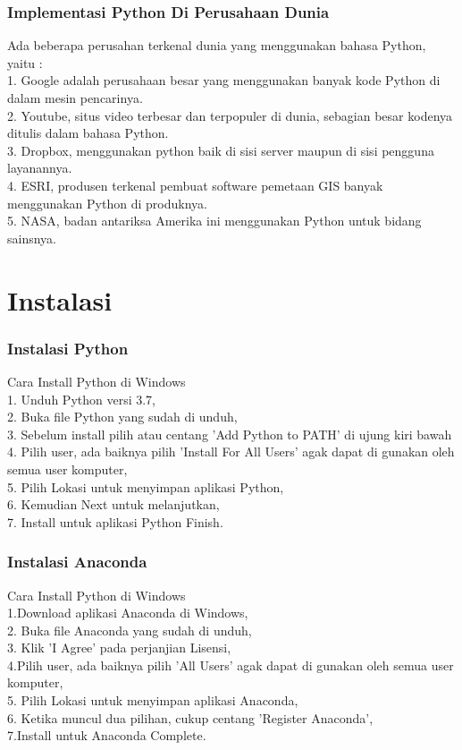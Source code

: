\documentclass[11pt]{Article}
\begin{document}
\subsubsection{Implementasi Python Di Perusahaan Dunia}

Ada beberapa perusahan terkenal dunia yang menggunakan bahasa Python, yaitu :\\
1. Google adalah perusahaan besar yang menggunakan banyak kode Python di dalam mesin pencarinya.\\
2. Youtube, situs video terbesar dan terpopuler di dunia, sebagian besar kodenya ditulis dalam bahasa Python.\\
3. Dropbox, menggunakan python baik di sisi server maupun di sisi pengguna layanannya.\\
4. ESRI, produsen terkenal pembuat software pemetaan GIS banyak menggunakan Python di produknya.\\
5. NASA, badan antariksa Amerika ini menggunakan Python untuk bidang sainsnya.
\section{Instalasi}
\subsubsection{Instalasi Python}

Cara Install Python di Windows\\
1. Unduh Python versi 3.7,\\
2. Buka file Python yang sudah di unduh,\\
3. Sebelum install pilih atau centang 'Add Python to PATH' di ujung kiri bawah
4. Pilih user, ada baiknya pilih 'Install For All Users' agak dapat di gunakan oleh semua user komputer,\\
5. Pilih Lokasi untuk menyimpan aplikasi Python,\\
6. Kemudian Next untuk melanjutkan,\\
7. Install untuk aplikasi Python Finish.
\subsubsection{Instalasi Anaconda}
Cara Install Python di Windows\\
1.Download aplikasi Anaconda di Windows, \\
2. Buka file Anaconda yang sudah di unduh,\\
3. Klik 'I Agree' pada perjanjian Lisensi,\\
4.Pilih user, ada baiknya pilih 'All Users' agak dapat di gunakan oleh semua user komputer,\\
5. Pilih Lokasi untuk menyimpan aplikasi Anaconda,\\
6. Ketika muncul dua pilihan, cukup centang 'Register Anaconda',\\
7.Install untuk Anaconda Complete.
\end{document}
